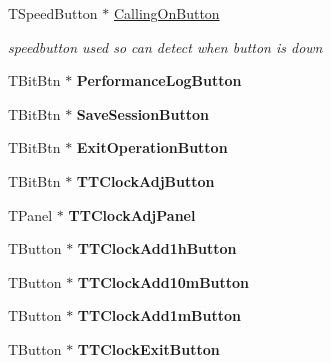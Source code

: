 \begin{DoxyCompactItemize}
\mbox{\label{class_t_interface_a4c3b977862eea5eae2631c9af65ac069}} 
T\+Speed\+Button $\ast$ \mbox{\hyperlink{class_t_interface_a4c3b977862eea5eae2631c9af65ac069}{Calling\+On\+Button}}
\begin{DoxyCompactList}\small\item\em speedbutton used so can detect when button is down \end{DoxyCompactList}\item 
\mbox{\label{class_t_interface_a9244812961d0ebb1001305b0486d23e2}} 
T\+Bit\+Btn $\ast$ {\bfseries Performance\+Log\+Button}
\item 
\mbox{\label{class_t_interface_a1186be2f10c6d71e2f2c50a2fd9e573b}} 
T\+Bit\+Btn $\ast$ {\bfseries Save\+Session\+Button}
\item 
\mbox{\label{class_t_interface_a7f8ee675b1f05ed8711b01f8a97e9164}} 
T\+Bit\+Btn $\ast$ {\bfseries Exit\+Operation\+Button}
\item 
\mbox{\label{class_t_interface_ae6645a1f27a503f98bf153653b3f5783}} 
T\+Bit\+Btn $\ast$ {\bfseries T\+T\+Clock\+Adj\+Button}
\item 
\mbox{\label{class_t_interface_aa1cda2e96293955038f417dc2ed73ed8}} 
T\+Panel $\ast$ {\bfseries T\+T\+Clock\+Adj\+Panel}
\item 
\mbox{\label{class_t_interface_aad9bb9881a0ab243f6b4465ba304e72f}} 
T\+Button $\ast$ {\bfseries T\+T\+Clock\+Add1h\+Button}
\item 
\mbox{\label{class_t_interface_a8823b74bcb53b02854a70c245cd0b198}} 
T\+Button $\ast$ {\bfseries T\+T\+Clock\+Add10m\+Button}
\item 
\mbox{\label{class_t_interface_a0147376dd9eca79176bfe51274005170}} 
T\+Button $\ast$ {\bfseries T\+T\+Clock\+Add1m\+Button}
\item 
\mbox{\label{class_t_interface_a1d5f43f166c1041d43643e5797c09ce7}} 
T\+Button $\ast$ {\bfseries T\+T\+Clock\+Exit\+Button}
\item 

\end{DoxyCompactItemize}
